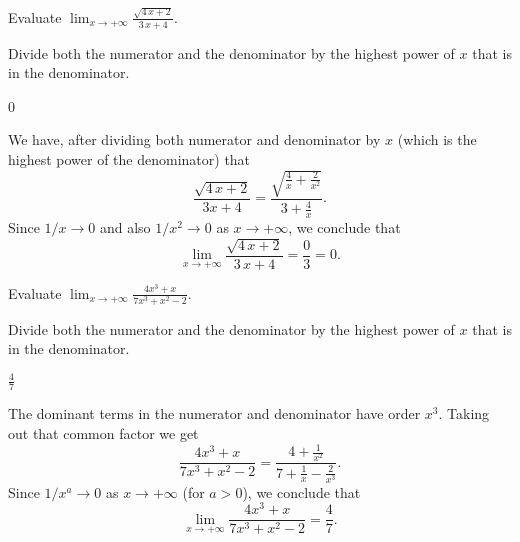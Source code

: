 \begin{question}[2015Q]
Evaluate $\displaystyle \lim_{x\to +\infty} \frac{ \sqrt{4\,x + 2}}{3\,x+4}$.
\end{question}
\begin{hint}
Divide both the numerator and the denominator by the highest
         power of $x$ that is in the denominator.
\end{hint}
\begin{answer} 0
\end{answer}
\begin{solution}
We have, after dividing both numerator and denominator by $x$ (which is the highest power of the denominator) that
$$\frac{ \sqrt{4\,x + 2}}{3x+4}=\frac{\sqrt{\frac 4 x + \frac 2 {x^2}}}{3 + \frac 4 x}.$$
Since $1/x\to 0$ and also $1/x^2\to 0$ as $x\to +\infty$, we conclude that
$$\lim_{x\to +\infty} \frac{ \sqrt{4\,x + 2}} {3\,x+4}=\frac {0}{3} = 0.$$
\end{solution}




\begin{question}[2015Q]
 Evaluate $\displaystyle \lim_{x\to +\infty} \frac{4x^3+x}{7x^3 + x^2 - 2}$.
\end{question}
\begin{hint}
Divide both the numerator and the denominator by the highest
         power of $x$ that is in the denominator.
\end{hint}
\begin{answer}
$\frac{4}{7}$
\end{answer}
\begin{solution}
The dominant terms in the numerator and denominator have order $x^3$.  Taking
out that common factor we get
$$\frac{4x^3+x}{7x^3 + x^2 - 2}
= \frac{4 + \frac{1}{x^2}}{7 + \frac{1}{x} - \frac{2}{x^3}}.$$
Since $1/x^a\to 0$ as $x\to +\infty$ (for $a>0$),
we conclude that $$\lim_{x\to +\infty} \frac{4x^3+x}{7x^3 +x^2-2}=\frac{4}{7}.$$
\end{solution}


